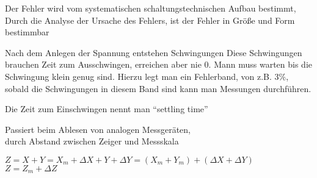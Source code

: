 \documentclass[letterpaper,10pt,english]{jupyterBook}
\begin{document}
\begin{DUlineblock}{0em}
\item[] 
\end{DUlineblock}

\begin{DUlineblock}{0em}
\item[] 
\end{DUlineblock}

\sphinxAtStartPar
Der Fehler wird vom systematischen schaltungstechnischen Aufbau bestimmt,
Durch die Analyse der Ursache des Fehlers,
ist der Fehler in Größe und Form bestimmbar

\begin{DUlineblock}{0em}
\item[] 
\end{DUlineblock}

\sphinxAtStartPar
Nach dem Anlegen der Spannung entstehen Schwingungen
Diese Schwingungen brauchen Zeit zum Ausschwingen,
erreichen aber nie \(0\).
Mann muss warten bis die Schwingung klein genug sind.
Hierzu legt man ein Fehlerband, von z.B. \(3\%\),
sobald die Schwingungen in diesem Band sind kann man Messungen durchführen.

\sphinxAtStartPar
Die Zeit zum Einschwingen nennt man “settling time”

\begin{DUlineblock}{0em}
\item[] 
\end{DUlineblock}

\sphinxAtStartPar
Passiert beim Ablesen von analogen Messgeräten,\\
durch Abstand zwischen Zeiger und Messskala

\begin{DUlineblock}{0em}
\item[] 
\end{DUlineblock}

\begin{DUlineblock}{0em}
\item[] 
\end{DUlineblock}

\sphinxAtStartPar
\(Z = X + Y = X_m + \Delta X + Y + \Delta Y = \left(X_m + Y_m\right) + \left(\Delta X + \Delta Y\right)\)\\
\(Z = Z_m + \Delta Z\)
\end{document}
